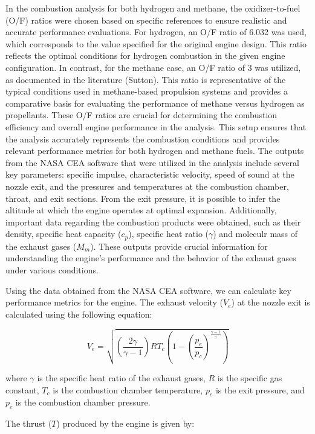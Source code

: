 In the combustion analysis for both hydrogen and methane, the oxidizer-to-fuel (O/F) ratios were chosen based on specific references to ensure realistic and accurate performance evaluations. For hydrogen, an O/F ratio of 6.032 was used, which corresponds to the value specified for the original engine design. This ratio reflects the optimal conditions for hydrogen combustion in the given engine configuration. In contrast, for the methane case, an O/F ratio of 3 was utilized, as documented in the literature (Sutton). This ratio is representative of the typical conditions used in methane-based propulsion systems and provides a comparative basis for evaluating the performance of methane versus hydrogen as propellants. These O/F ratios are crucial for determining the combustion efficiency and overall engine performance in the analysis.
This setup ensures that the analysis accurately represents the combustion conditions and provides relevant performance metrics for both hydrogen and methane fuels.
The outputs from the NASA CEA software that were utilized in the analysis include several key parameters: specific impulse, characteristic velocity, speed of sound at the nozzle exit, and the pressures and temperatures at the combustion chamber, throat, and exit sections. From the exit pressure, it is possible to infer the altitude at which the engine operates at optimal expansion. Additionally, important data regarding the combustion products were obtained, such as their density, specific heat capacity (\(c_p\)), specific heat ratio (\(\gamma\)) and moleculr mass of the exhaust gases (\(M_m\)). These outputs provide crucial information for understanding the engine's performance and the behavior of the exhaust gases under various conditions.

Using the data obtained from the NASA CEA software, we can calculate key performance metrics for the engine. The exhaust velocity (\(V_e\)) at the nozzle exit is calculated using the following equation:

\[
V_{e} = \sqrt{\left(\frac{2 \gamma}{\gamma - 1}\right) R T_{c} \left(1 - \left(\frac{p_{e}}{p_{c}}\right)^{\frac{\gamma - 1}{\gamma}}\right)}
\]

where \( \gamma \) is the specific heat ratio of the exhaust gases, \( R\) is the specific gas constant, \( T_{c} \) is the combustion chamber temperature, \( p_{e} \) is the exit pressure, and \( p_{c} \) is the combustion chamber pressure.

The thrust (\( T \)) produced by the engine is given by:

